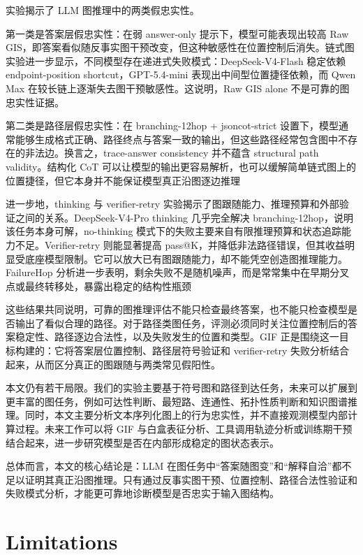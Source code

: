 \documentclass[
  11pt,
]{article}
\begin{document}
实验揭示了 LLM 图推理中的两类假忠实性。

第一类是答案层假忠实性：在弱 answer-only 提示下，模型可能表现出较高 Raw
GIS，即答案看似随反事实图干预改变，但这种敏感性在位置控制后消失。链式图实验进一步显示，不同模型存在递进式失败模式：DeepSeek-V4-Flash
稳定依赖 endpoint-position shortcut，GPT-5.4-mini
表现出中间型位置捷径依赖，而 Qwen Max
在较长链上逐渐失去图干预敏感性。这说明，Raw GIS alone
不是可靠的图忠实性证据。

第二类是路径层假忠实性：在 branching-12hop + jsoncot-strict
设置下，模型通常能够生成格式正确、路径终点与答案一致的输出，但这些路径经常包含图中不存在的非法边。换言之，trace-answer
consistency 并不蕴含 structural path validity。结构化 CoT
可以让模型的输出更容易解析，也可以缓解简单链式图上的位置捷径，但它本身并不能保证模型真正沿图逐边推理

进一步地，thinking 与 verifier-retry
实验揭示了图跟随能力、推理预算和外部验证之间的关系。DeepSeek-V4-Pro
thinking 几乎完全解决 branching-12hop，说明该任务本身可解，no-thinking
模式下的失败主要来自有限推理预算和状态追踪能力不足。Verifier-retry
则能显著提高
pass@K，并降低非法路径错误，但其收益明显受底座模型限制。它可以放大已有图跟随能力，却不能凭空创造图推理能力。FailureHop
分析进一步表明，剩余失败不是随机噪声，而是常常集中在早期分叉点或最终转移处，暴露出稳定的结构性瓶颈

这些结果共同说明，可靠的图推理评估不能只检查最终答案，也不能只检查模型是否输出了看似合理的路径。对于路径类图任务，评测必须同时关注位置控制后的答案稳定性、路径逐边合法性，以及失败发生的位置和类型。GIF
正是围绕这一目标构建的：它将答案层位置控制、路径层符号验证和
verifier-retry 失败分析结合起来，从而区分真正的图跟随与两类常见假阳性。

本文仍有若干局限。我们的实验主要基于符号图和路径到达任务，未来可以扩展到更丰富的图任务，例如可达性判断、最短路、连通性、拓扑性质判断和知识图谱推理。同时，本文主要分析文本序列化图上的行为忠实性，并不直接观测模型内部计算过程。未来工作可以将
GIF
与白盒表征分析、工具调用轨迹分析或训练期干预结合起来，进一步研究模型是否在内部形成稳定的图状态表示。

总体而言，本文的核心结论是：LLM
在图任务中``答案随图变''和``解释自洽''都不足以证明其真正沿图推理。只有通过反事实图干预、位置控制、路径合法性验证和失败模式分析，才能更可靠地诊断模型是否忠实于输入图结构。

\section{Limitations}\label{limitations}
\end{document}
